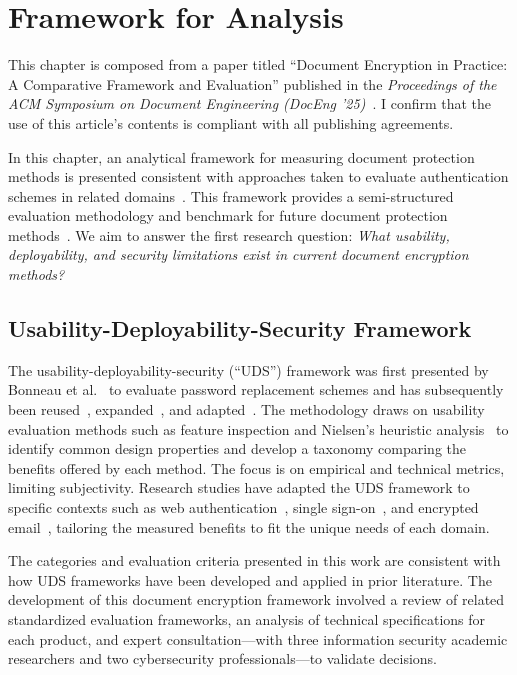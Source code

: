 \chapter{Framework for Analysis}
\label{ch:evaluation}

This chapter is composed from a paper titled ``Document Encryption in Practice: A Comparative Framework and Evaluation'' published in the \textit{Proceedings of the ACM Symposium on Document Engineering (DocEng '25)}~\cite{teuscher_document_2025}.
I confirm that the use of this article's contents is compliant with all publishing agreements.

In this chapter, an analytical framework for measuring document protection methods is presented consistent with approaches taken to evaluate authentication schemes in related domains~\cite{alaca_comparative_2021-1,alaca_comparative_2021,bonneau_quest_2012,borisov_sok_2021}. This framework provides a semi-structured evaluation methodology and benchmark for future document protection methods~\cite{bonneau_quest_2012}. We aim to answer the first research question: \emph{What usability, deployability, and security limitations exist in current document encryption methods?}

\section{Usability-Deployability-Security Framework}
\label{sec:uds-framework}

The usability-deployability-security (``UDS'') framework was first presented by Bonneau et al.~\cite{bonneau_quest_2012} to evaluate password replacement schemes and has subsequently been reused~\cite{alaca_comparative_2021-1,alaca_comparative_2021}, expanded~\cite{zimmermann_quest_2018}, and adapted~\cite{borisov_sok_2021}. The methodology draws on usability evaluation methods such as feature inspection and Nielsen's heuristic analysis~\cite{nielsen_heuristic_1994} to identify common design properties and develop a taxonomy comparing the benefits offered by each method. The focus is on empirical and technical metrics, limiting subjectivity. Research studies have adapted the UDS framework to specific contexts such as web authentication~\cite{alaca_comparative_2021-1}, single sign-on~\cite{alaca_comparative_2021}, and encrypted email~\cite{borisov_sok_2021}, tailoring the measured benefits to fit the unique needs of each domain.

The categories and evaluation criteria presented in this work are consistent with how UDS frameworks have been developed and applied in prior literature. The development of this document encryption framework involved a review of related standardized evaluation frameworks, an analysis of technical specifications for each product, and expert consultation---with three information security academic researchers and two cybersecurity professionals---to validate decisions.

